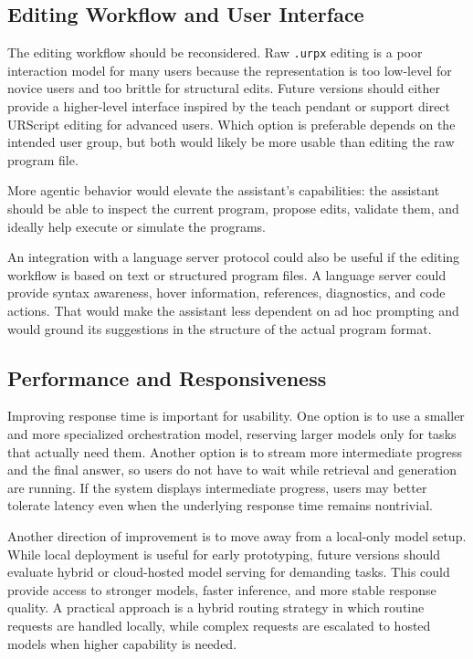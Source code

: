 \subsection{Editing Workflow and User Interface}
The editing workflow should be reconsidered. Raw \texttt{.urpx} editing is a poor interaction model for many users because the representation is too low-level for novice users and too brittle for structural edits. Future versions should either provide a higher-level interface inspired by the teach pendant or support direct URScript editing for advanced users. Which option is preferable depends on the intended user group, but both would likely be more usable than editing the raw program file.

More agentic behavior would elevate the assistant's capabilities: the assistant should be able to inspect the current program, propose edits, validate them, and ideally help execute or simulate the programs.

An integration with a language server protocol could also be useful if the editing workflow is based on text or structured program files. A language server could provide syntax awareness, hover information, references, diagnostics, and code actions. That would make the assistant less dependent on ad hoc prompting and would ground its suggestions in the structure of the actual program format.

\subsection{Performance and Responsiveness}
Improving response time is important for usability. One option is to use a smaller and more specialized orchestration model, reserving larger models only for tasks that actually need them. Another option is to stream more intermediate progress and the final answer, so users do not have to wait while retrieval and generation are running. If the system displays intermediate progress, users may better tolerate latency even when the underlying response time remains nontrivial.

Another direction of improvement is to move away from a local-only model setup. While local deployment is useful for early prototyping, future versions should evaluate hybrid or cloud-hosted model serving for demanding tasks. This could provide access to stronger models, faster inference, and more stable response quality. A practical approach is a hybrid routing strategy in which routine requests are handled locally, while complex requests are escalated to hosted models when higher capability is needed.

